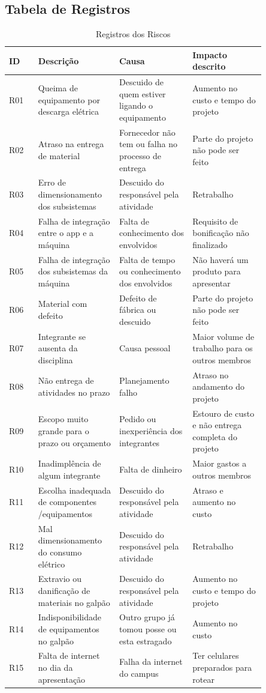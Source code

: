 \begin{apendicesenv}
\subsection{Tabela de Registros}
\begin{table}[!htp]
    \centering
    \caption{Registros dos Riscos}
    \label{my-label}
    \begin{tabular}{|p{0.10\linewidth}|p{0.25\linewidth}|p{0.25\linewidth}|p{0.25\linewidth}|}
    \hline
    \textbf{ID} & \textbf{Descrição} & \textbf{Causa} & \textbf{Impacto descrito} \\ \hline
    R01 & Queima de equipamento por descarga elétrica & Descuido de quem estiver ligando o equipamento & Aumento no custo e tempo do projeto \\ \hline
    R02 & Atraso na entrega de material & Fornecedor não tem ou falha no processo de entrega & Parte do projeto não pode ser feito \\ \hline
    R03 & Erro de dimensionamento dos subsistemas & Descuido do responsável pela atividade & Retrabalho \\ \hline
    R04 & Falha de integração entre o app e a máquina & Falta de conhecimento dos envolvidos & Requisito de bonificação não finalizado \\ \hline
    R05 & Falha de integração dos subsistemas da máquina & Falta de tempo ou conhecimento dos envolvidos & Não haverá um produto para apresentar \\ \hline
    R06 & Material com defeito & Defeito de fábrica ou descuido & Parte do projeto não pode ser feito \\ \hline
    R07 & Integrante se ausenta da disciplina & Causa pessoal & Maior volume de trabalho para os outros membros \\ \hline
    R08 & Não entrega de atividades no prazo & Planejamento falho & Atraso no andamento do projeto \\ \hline
    R09 & Escopo muito grande para o prazo ou orçamento & Pedido ou inexperiência dos integrantes & Estouro de custo e não entrega completa do projeto \\ \hline
    R10 & Inadimplência de algum integrante & Falta de dinheiro & Maior gastos a outros membros \\ \hline
    R11 & Escolha inadequada de componentes /equipamentos & Descuido do responsável pela atividade & Atraso e aumento no custo \\ \hline
    R12 & Mal dimensionamento do consumo elétrico & Descuido do responsável pela atividade & Retrabalho \\ \hline
    R13 & Extravio ou danificação de materiais no galpão & Descuido do responsável pela atividade & Aumento no custo e tempo do projeto \\ \hline
    R14 & Indisponibilidade de equipamentos no galpão & Outro grupo já tomou posse ou esta estragado & Aumento no custo \\ \hline
    R15 & Falta de internet no dia da apresentação & Falha da internet do campus & Ter celulares preparados para rotear \\ \hline
    \end{tabular}
\end{table}


\end{apendicesenv}
